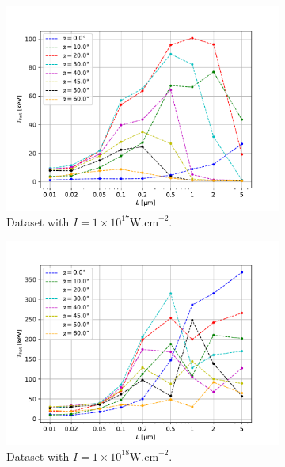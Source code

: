 \begin{figure}[t]
	\centering
	\begin{subfigure}{0.49\textwidth}
		\centering
		\includegraphics[width=\textwidth]{figures/t_hot_l_17}
		\caption{Dataset with $I = 1 \times 10^{17} \mathrm{W.cm}^{-2}$.}
		\label{fig:dataset3-a}
	\end{subfigure}
	\hfill
	\begin{subfigure}{0.49\textwidth}
		\centering
		\includegraphics[width=\textwidth]{figures/t_hot_l_18}
		\caption{Dataset with $I = 1 \times 10^{18} \mathrm{W.cm}^{-2}$.}
		\label{fig:datset3-b}
	\end{subfigure}
	\begin{subfigure}{0.59\textwidth}

\end{subfigure}
\end{figure}

